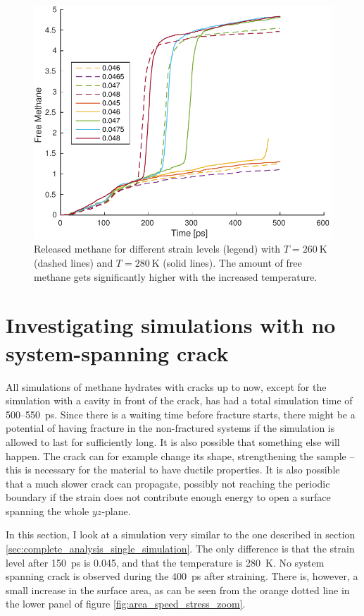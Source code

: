\begin{figure}
\centering
\includegraphics[width=12cm]{../figures/thesis/released_methane_temp.pdf}
\caption{Released methane for different strain levels (legend) with $T = \SI{260}{\kelvin}$ (dashed lines) and $T = \SI{280}{\kelvin}$ (solid lines). The amount of free methane gets significantly higher with the increased temperature.}
\label{fig:released_methane_temp}
\end{figure}



\section{Investigating simulations with no system-spanning crack}
All simulations of methane hydrates with cracks up to now, except for the simulation with a cavity in front of the crack, has had a total simulation time of 500--\SI{550}{\pico\second}. Since there is a waiting time before fracture starts, there might be a potential of having fracture in the non-fractured systems if the simulation is allowed to last for sufficiently long. It is also possible that something else will happen. The crack can for example change its shape, strengthening the sample -- this is necessary for the material to have ductile properties. It is also possible that a much slower crack can propagate, possibly not reaching the periodic boundary if the strain does not contribute enough energy to open a surface spanning the whole $yz$-plane. 

In this section, I look at a simulation very similar to the one described in section \ref{sec:complete_analysis_single_simulation}. The only difference is that the strain level after \SI{150}{\pico\second} is 0.045, and that the temperature is \SI{280}{\kelvin}. No system spanning crack is observed during the \SI{400}{\pico\second} after straining. There is, however, a small increase in the surface area, as can be seen from the orange dotted line in the lower panel of figure \ref{fig:area_speed_stress_zoom}.

